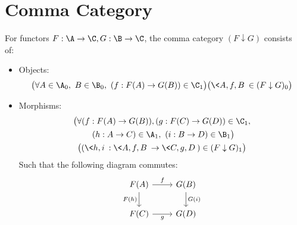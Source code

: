 \section{Comma Category}
\begin{definition}
  For functors $F:\A\to \C, G:\B\to \C$, the comma category $(F\downarrow G)$
  consists of:~\parencite[p.~59]{leinster:basic_category_theory}
  \begin{itemize}
    \item Objects:
      \[\big(\forall A\in \A_0,\ B\in \B_0,\ (f: F(A) \to G(B))\in \C_1\big)
        \big(\< A, f, B\>\in (F\downarrow G)_0\big)\]
    \item Morphisms:
      \[
        \begin{gathered}
          \big(\forall (f: F(A) \to G(B)), (g: F(C)\to G(D))\in \C_1,\\
            \ (h: A \to C)\in \A_1,\ (i: B\to D)\in \B_1\big)\\
          \big((\<h, i\> : \<A, f, B\> \to \<C, g, D\>)
            \in (F\downarrow G)_1\big)
        \end{gathered}
      \]
      Such that the following diagram commutes:
      \[\begin{tikzcd}[ampersand replacement=\&]
        {F(A)} \& {G(B)} \\
        {F(C)} \& {G(D)}
        \arrow["{F(h)}"', from=1-1, to=2-1]
        \arrow["{G(i)}", from=1-2, to=2-2]
        \arrow["f", from=1-1, to=1-2]
        \arrow["g"', from=2-1, to=2-2]
      \end{tikzcd}\]
  \end{itemize}
\end{definition}

